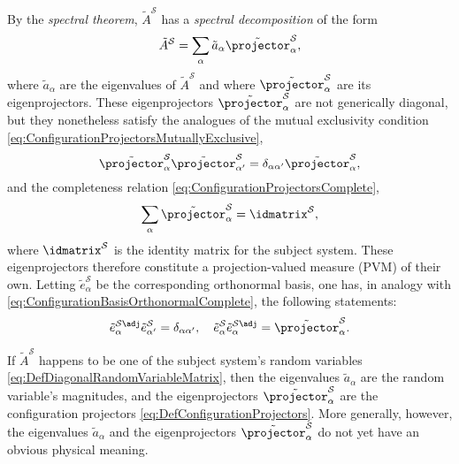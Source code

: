 \documentclass[12pt,english,prl,superscriptaddress,nobibnotes,nofootinbib]{revtex4-2}
\begin{document}
By the \emph{spectral theorem}, $\tilde{A}^{\mathcal{S}}$ has a
\emph{spectral decomposition} of the form 
\begin{equation}
\tilde{A}^{\mathcal{S}}=\sum_{\alpha}\tilde{a}_{\alpha}\tilde{\projector}_{\alpha}^{\mathcal{S}},\label{eq:ObservableSpectralDecomposition}
\end{equation}
 where $\tilde{a}_{\alpha}$ are the eigenvalues of $\tilde{A}^{\mathcal{S}}$
and where $\tilde{\projector}_{\alpha}^{\mathcal{S}}$ are its eigenprojectors.
These eigenprojectors $\tilde{\projector}_{\alpha}^{\mathcal{S}}$
are not generically diagonal, but they nonetheless satisfy the analogues
of the mutual exclusivity condition \eqref{eq:ConfigurationProjectorsMutuallyExclusive},
\begin{equation}
\tilde{\projector}_{\alpha}^{\mathcal{S}}\tilde{\projector}_{\alpha^{\prime}}^{\mathcal{S}}=\delta_{\alpha\alpha^{\prime}}\tilde{\projector}_{\alpha}^{\mathcal{S}},\label{eq:ObservableProjectorsMutuallyExclusive}
\end{equation}
 and the completeness relation \eqref{eq:ConfigurationProjectorsComplete},
\begin{equation}
\sum_{\alpha}\tilde{\projector}_{\alpha}^{\mathcal{S}}=\idmatrix^{\mathcal{S}},\label{eq:ObservableProjectorsComplete}
\end{equation}
 where $\idmatrix^{\mathcal{S}}$ is the identity matrix for the subject
system. These eigenprojectors therefore constitute a projection-valued
measure (PVM) of their own. Letting $\tilde{e}_{\alpha}^{\mathcal{S}}$
be the corresponding orthonormal basis, one has, in analogy with \eqref{eq:ConfigurationBasisOrthonormalComplete},
the following statements: 
\begin{equation}
\tilde{e}_{\alpha}^{\mathcal{S}\adj}\tilde{e}_{\alpha^{\prime}}^{\mathcal{S}}=\delta_{\alpha\alpha^{\prime}},\quad\tilde{e}_{\alpha}^{\mathcal{S}}\tilde{e}_{\alpha}^{\mathcal{S}\adj}=\tilde{\projector}_{\alpha}^{\mathcal{S}}.\label{eq:ObservableBasisOrthonormalComplete}
\end{equation}

If $\tilde{A}^{\mathcal{S}}$ happens to be one of the subject system's
random variables \eqref{eq:DefDiagonalRandomVariableMatrix}, then
the eigenvalues $\tilde{a}_{\alpha}$ are the random variable's magnitudes,
and the eigenprojectors $\tilde{\projector}_{\alpha}^{\mathcal{S}}$
are the configuration projectors \eqref{eq:DefConfigurationProjectors}.
More generally, however, the eigenvalues $\tilde{a}_{\alpha}$ and
the eigenprojectors $\tilde{\projector}_{\alpha}^{\mathcal{S}}$ do
not yet have an obvious physical meaning.
\end{document}
